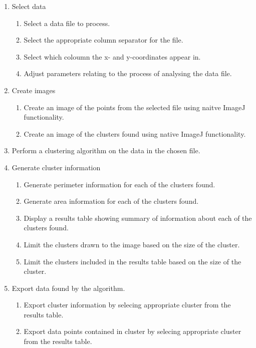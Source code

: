 \begin{enumerate}
	\item Select data
		\begin{enumerate}
			\item Select a data file to process.
			\item Select the appropriate column separator for the file.
			\item Select which coloumn the x- and y-coordinates appear in.
			\item Adjust parameters relating to the process of analysing the
				data file.
		\end{enumerate}
	\item Create images
		\begin{enumerate}
			\item Create an image of the points from the selected file using
				naitve ImageJ functionality.
			\item Create an image of the clusters found using native ImageJ
				functionality.
		\end{enumerate}
	\item Perform a clustering algorithm on the data in the chosen file.
	\item Generate cluster information
		\begin{enumerate}
			\item Generate perimeter information for each of the clusters
				found.
			\item Generate area information for each of the clusters found.
			\item Display a results table showing summary of information about
				each of the clusters found.
			\item Limit the clusters drawn to the image based on the size of
				the cluster.
			\item Limit the clusters included in the results table based on the
				size of the cluster.
		\end{enumerate}
	\item Export data found by the algorithm.
		\begin{enumerate}
			\item Export cluster information by selecing appropriate cluster
				from the results table.
			\item Export data points contained in cluster by selecing
				appropriate cluster from the results table.
		\end{enumerate}
\end{enumerate}

